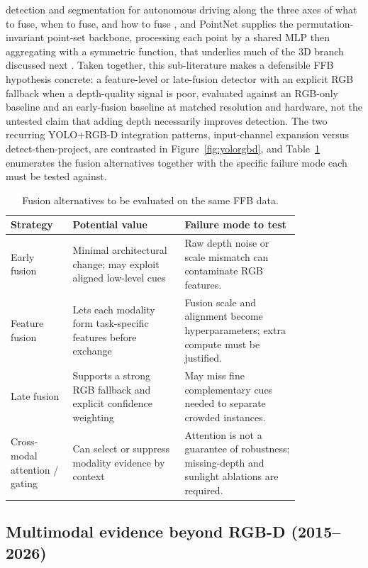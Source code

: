 detection and segmentation for autonomous driving along the three axes of what to fuse, when to fuse, and how to fuse \cite{feng2021multimodalsurvey}, and PointNet supplies the permutation-invariant point-set backbone, processing each point by a shared MLP then aggregating with a symmetric function, that underlies much of the 3D branch discussed next \cite{qi2017pointnet}. Taken together, this sub-literature makes a defensible FFB hypothesis concrete: a feature-level or late-fusion detector with an explicit RGB fallback when a depth-quality signal is poor, evaluated against an RGB-only baseline and an early-fusion baseline at matched resolution and hardware, not the untested claim that adding depth necessarily improves detection. The two recurring YOLO+RGB-D integration patterns, input-channel expansion versus detect-then-project, are contrasted in Figure~\ref{fig:yolorgbd}, and Table~\ref{tab:fusion} enumerates the fusion alternatives together with the specific failure mode each must be tested against.

\begin{table}[t]
\centering\small
\caption{Fusion alternatives to be evaluated on the same FFB data.}
\label{tab:fusion}
\begin{tabular}{p{0.16\linewidth}p{0.32\linewidth}p{0.33\linewidth}}
\toprule
Strategy & Potential value & Failure mode to test \\
\midrule
Early fusion & Minimal architectural change; may exploit aligned low-level cues & Raw depth noise or scale mismatch can contaminate RGB features. \\
Feature fusion & Lets each modality form task-specific features before exchange & Fusion scale and alignment become hyperparameters; extra compute must be justified. \\
Late fusion & Supports a strong RGB fallback and explicit confidence weighting & May miss fine complementary cues needed to separate crowded instances. \\
Cross-modal attention / gating & Can select or suppress modality evidence by context & Attention is not a guarantee of robustness; missing-depth and sunlight ablations are required. \\
\bottomrule
\end{tabular}
\end{table}



\subsection{Multimodal evidence beyond RGB-D (2015--2026)}

